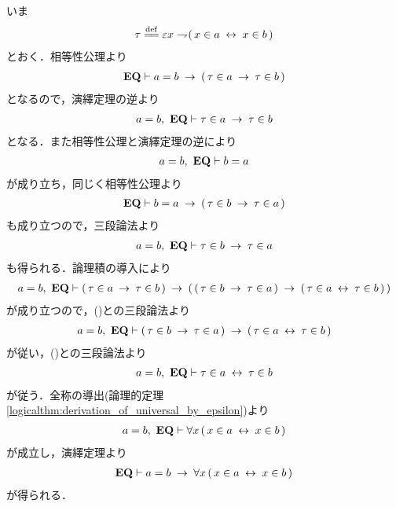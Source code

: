 	\begin{prf}
		いま
		\begin{align}
			\tau \defeq \varepsilon x \negation (\, x \in a  \lrarrow x \in b\, )
		\end{align}
		とおく．相等性公理より
		\begin{align}
			\mbox{{\bf EQ}} \vdash a = b \hspace{0.25em}\rightarrow\hspace{0.25em} (\, \tau \in a \hspace{0.25em}\rightarrow\hspace{0.25em} \tau \in b\, )
		\end{align}
		となるので，演繹定理の逆より
		\begin{align}
			a = b,\ \mbox{{\bf EQ}} \vdash \tau \in a \hspace{0.25em}\rightarrow\hspace{0.25em} \tau \in b
			\label{fom:inverse_of_axiom_of_extensionality_1}
		\end{align}
		となる．また相等性公理と演繹定理の逆により
		\begin{align}
			a = b,\ \mbox{{\bf EQ}} \vdash b = a
		\end{align}
		が成り立ち，同じく相等性公理より
		\begin{align}
			\mbox{{\bf EQ}} \vdash b = a \hspace{0.25em}\rightarrow\hspace{0.25em} (\, \tau \in b \hspace{0.25em}\rightarrow\hspace{0.25em} \tau \in a\, )
		\end{align}
		も成り立つので，三段論法より
		\begin{align}
			a = b,\ \mbox{{\bf EQ}} \vdash \tau \in b \hspace{0.25em}\rightarrow\hspace{0.25em} \tau \in a
			\label{fom:inverse_of_axiom_of_extensionality_2}
		\end{align}
		も得られる．論理積の導入により
		\begin{align}
			a = b,\ \mbox{{\bf EQ}} \vdash (\, \tau \in a \hspace{0.25em}\rightarrow\hspace{0.25em} \tau \in b\, )
			\hspace{0.25em}\rightarrow\hspace{0.25em} (\, (\, \tau \in b \hspace{0.25em}\rightarrow\hspace{0.25em} \tau \in a\, )
			\hspace{0.25em}\rightarrow\hspace{0.25em} (\, \tau \in a \hspace{0.25em}\leftrightarrow\hspace{0.25em} \tau \in b\, )\, )
		\end{align}
		が成り立つので，()との三段論法より
		\begin{align}
			a = b,\ \mbox{{\bf EQ}} \vdash (\, \tau \in b \hspace{0.25em}\rightarrow\hspace{0.25em} \tau \in a\, )
			\hspace{0.25em}\rightarrow\hspace{0.25em} (\, \tau \in a \hspace{0.25em}\leftrightarrow\hspace{0.25em} \tau \in b\, )
		\end{align}
		が従い，()との三段論法より
		\begin{align}
			a = b,\ \mbox{{\bf EQ}} \vdash \tau \in a \hspace{0.25em}\leftrightarrow\hspace{0.25em} \tau \in b
		\end{align}
		が従う．全称の導出(論理的定理\ref{logicalthm:derivation_of_universal_by_epsilon})より
		\begin{align}
			a = b,\ \mbox{{\bf EQ}} \vdash \forall x\, (\, x \in a  \hspace{0.25em}\leftrightarrow\hspace{0.25em} x \in b\, )
		\end{align}
		が成立し，演繹定理より
		\begin{align}
			\mbox{{\bf EQ}} \vdash a = b \hspace{0.25em}\rightarrow\hspace{0.25em} \forall x\, (\, x \in a  \hspace{0.25em}\leftrightarrow\hspace{0.25em} x \in b\, )
		\end{align}
		が得られる．
		\QED
	\end{prf}
	
